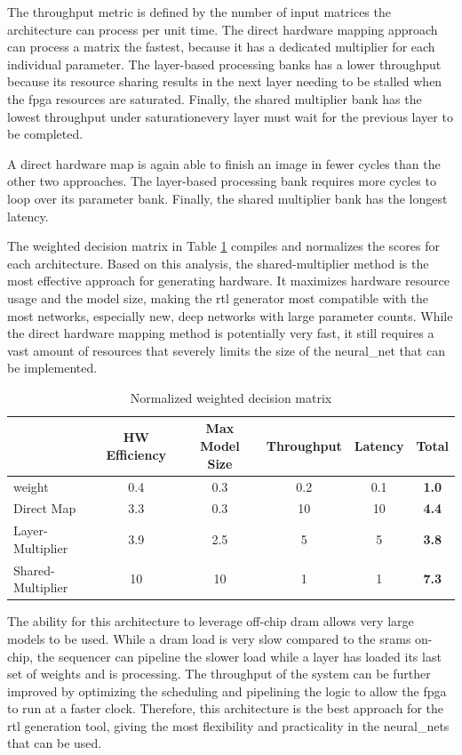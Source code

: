 \documentclass{uw-ece-wkrpt}
\begin{document}
The throughput metric is defined by the number of input matrices the architecture can process per unit time. The direct hardware mapping approach can process a matrix the fastest, because it has a dedicated multiplier for each individual parameter. The layer-based processing banks has a lower throughput because its resource sharing results in the next layer needing to be stalled when the \gls{fpga} resources are saturated. Finally, the shared multiplier bank has the lowest throughput under saturation\textemdash{}every layer must wait for the previous layer to be completed.

A direct hardware map is again able to finish an image in fewer cycles than the other two approaches. The layer-based processing bank requires more cycles to loop over its parameter bank. Finally, the shared multiplier bank has the longest latency.

The weighted decision matrix in Table \ref{tab:decision_matrix} compiles and normalizes the scores for each architecture. Based on this analysis, the shared-multiplier method is the most effective approach for generating hardware. It maximizes hardware resource usage and the model size, making the \gls{rtl} generator most compatible with the most networks, especially new, deep networks with large parameter counts. While the direct hardware mapping method is potentially very fast, it still requires a vast amount of resources that severely limits the size of the \gls{neural_net} that can be implemented.

\begin{table}
\centering
\caption{Normalized weighted decision matrix}\label{tab:decision_matrix}
\begin{tabular}{lccccc}
\toprule
& HW Efficiency & Max Model Size & Throughput & Latency & \textbf{Total} \\
\midrule
\Gls{weight}            & 0.4           & 0.3            & 0.2        & 0.1     & \textbf{1.0} \\
Direct Map        & 3.3           & 0.3            & 10         & 10      & \textbf{4.4} \\
Layer-Multiplier  & 3.9           & 2.5            & 5          & 5       & \textbf{3.8} \\
Shared-Multiplier & 10            & 10             & 1          & 1       & \textbf{7.3} \\
\bottomrule
\end{tabular}
\end{table}

The ability for this architecture to leverage off-chip \gls{dram} allows very large models to be used. While a \gls{dram} load is very slow compared to the \glspl{sram} on-chip, the sequencer can pipeline the slower load while a layer has loaded its last set of weights and is processing. The throughput of the system can be further improved by optimizing the scheduling and pipelining the logic to allow the \gls{fpga} to run at a faster clock.  Therefore, this architecture is the best approach for the \gls{rtl} generation tool, giving the most flexibility and practicality in the \glspl{neural_net} that can be used.
\end{document}
